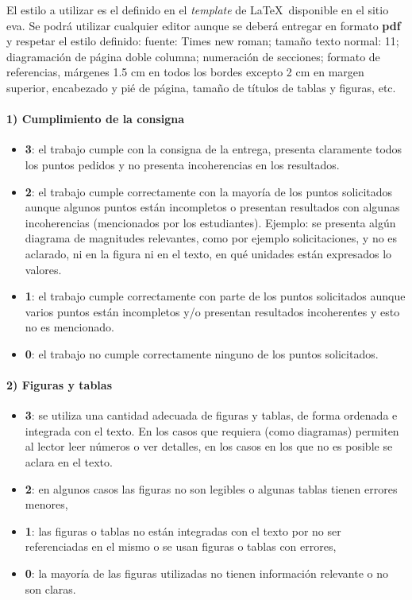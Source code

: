 \documentclass[a4paper,11pt,twocolumn]{article}
\begin{document}
El estilo a utilizar es el definido en el \textit{template} de \LaTeX \, disponible en el sitio eva. %
%
Se podrá utilizar cualquier editor aunque se deberá entregar en formato \textbf{pdf} y respetar el estilo definido: fuente: Times new roman; tamaño texto normal: 11; diagramación de página doble columna; numeración de secciones; formato de referencias, márgenes 1.5 cm en todos los bordes excepto 2 cm en margen superior, encabezado y pié de página, tamaño de títulos de tablas y figuras, etc.


\paragraph{1) Cumplimiento de la consigna} %
%
\begin{itemize}
	\item \textbf{3}: el trabajo cumple con la consigna de la entrega, presenta claramente todos los puntos pedidos y no presenta incoherencias en los resultados.
	\item \textbf{2}: el trabajo cumple correctamente con la mayoría de los puntos solicitados aunque algunos puntos están incompletos o presentan resultados con algunas incoherencias (mencionados por los estudiantes). %
	Ejemplo: se presenta algún diagrama de magnitudes relevantes, como por ejemplo solicitaciones, y no es aclarado, ni en la figura ni en el texto, en qué unidades están expresados lo valores.
	\item \textbf{1}: el trabajo cumple correctamente con parte de los puntos solicitados aunque varios puntos están incompletos y/o presentan resultados incoherentes y esto no es mencionado.
	\item \textbf{0}: el trabajo no cumple correctamente ninguno de los puntos solicitados.
\end{itemize}

\paragraph{2) Figuras y tablas}
\begin{itemize}
	\item \textbf{3}: se utiliza una cantidad adecuada de figuras y tablas, de forma ordenada e integrada con el texto. En los casos que requiera (como diagramas) permiten al lector leer números o ver detalles, en los casos en los que no es posible se aclara en el texto.
	\item \textbf{2}: en algunos casos las figuras no son legibles o algunas tablas tienen errores menores,
	\item \textbf{1}: las figuras o tablas no están integradas con el texto por no ser referenciadas en el mismo o se usan figuras o tablas con errores,
	\item \textbf{0}: la mayoría de las figuras utilizadas no tienen información relevante o no son claras.
\end{itemize}
\end{document}
